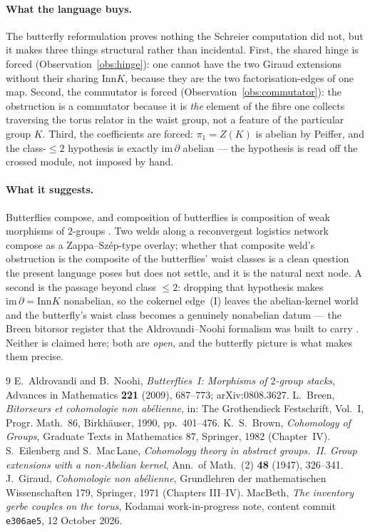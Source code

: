 \documentclass[11pt]{article}
\theoremstyle{definition}
\newcommand{\Inn}{\mathrm{Inn}}
\newcommand{\pione}{\pi_1}
\begin{document}
\paragraph{What the language buys.} The butterfly reformulation proves nothing the Schreier
computation did not, but it makes three things structural rather than incidental. First, the shared
hinge is forced (Observation~\ref{obs:hinge}): one cannot have the two Giraud extensions without
their sharing $\Inn K$, because they are the two factorisation-edges of one map. Second, the
commutator is forced (Observation~\ref{obs:commutator}): the obstruction is a commutator because it
is \emph{the} element of the fibre one collects traversing the torus relator in the waist group,
not a feature of the particular group $K$. Third, the coefficients are forced: $\pione=Z(K)$ is
abelian by Peiffer, and the class-$\le2$ hypothesis is exactly $\mathrm{im}\,\partial$ abelian ---
the hypothesis is read off the crossed module, not imposed by hand.

\paragraph{What it suggests.} Butterflies compose, and composition of butterflies is composition of
weak morphisms of $2$-groups \cite{butterflies}. Two welds along a reconvergent logistics network
compose as a Zappa--Sz\'ep-type overlay; whether that composite weld's obstruction is the composite
of the butterflies' waist classes is a clean question the present language poses but does not
settle, and it is the natural next node. A second is the passage beyond class $\le2$: dropping that
hypothesis makes $\mathrm{im}\,\partial=\Inn K$ nonabelian, so the cokernel edge~(I) leaves the
abelian-kernel world and the butterfly's waist class becomes a genuinely nonabelian datum --- the
Breen bitorsor register \cite{breen} that the Aldrovandi--Noohi formalism was built to carry
\cite{butterflies}. Neither is claimed here; both are \emph{open}, and the butterfly picture is
what makes them precise.

\begin{thebibliography}{9}
 E.~Aldrovandi and B.~Noohi, \emph{Butterflies~I: Morphisms of $2$-group
stacks}, Advances in Mathematics \textbf{221} (2009), 687--773; arXiv:0808.3627.
 L.~Breen, \emph{Bitorseurs et cohomologie non ab\'elienne}, in: The Grothendieck
Festschrift, Vol.~I, Progr. Math.\ 86, Birkh\"auser, 1990, pp.~401--476.
 K.~S.~Brown, \emph{Cohomology of Groups}, Graduate Texts in Mathematics 87,
Springer, 1982 (Chapter~IV).
 S.~Eilenberg and S.~Mac\,Lane, \emph{Cohomology theory in abstract groups.~II.
Group extensions with a non-Abelian kernel}, Ann.\ of Math.\ (2) \textbf{48} (1947), 326--341.
 J.~Giraud, \emph{Cohomologie non ab\'elienne}, Grundlehren der mathematischen
Wissenschaften 179, Springer, 1971 (Chapters III--IV).
 MacBeth, \emph{The inventory gerbe couples on the torus}, Kodamai
work-in-progress note, content commit \texttt{e306ae5}, 12 October 2026.
\end{thebibliography}
\end{document}
